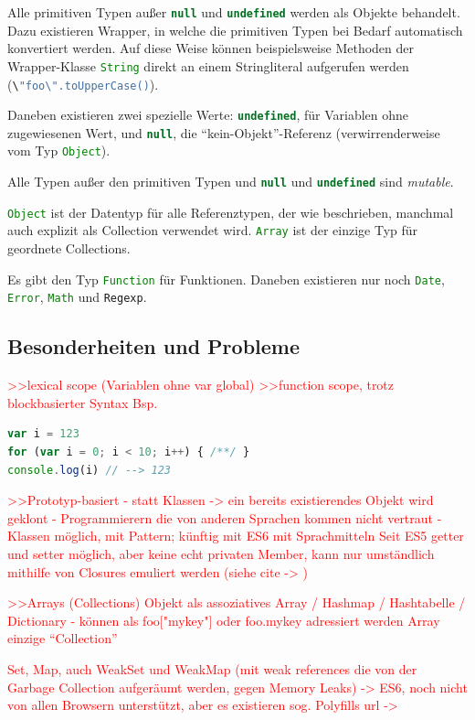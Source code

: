 \documentclass[a4paper, 12pt, hidelinks, listof=totoc, listoftables=totoc, bibliography=totoc]{scrreprt}
\newcommand{\js}[1]{\lstinline[language=JavaScript, style=inline]|#1|}
\newcommand{\TODO}[1]{\textcolor{red}{#1}\newline}
\begin{document}
Alle primitiven Typen außer \js{null} und \js{undefined} werden als Objekte behandelt. Dazu existieren Wrapper, in welche die primitiven Typen bei Bedarf automatisch konvertiert werden. Auf diese Weise können beispielsweise Methoden der Wrapper-Klasse \js{String} direkt an einem Stringliteral aufgerufen werden (\js{\"foo\".toUpperCase()}).

Daneben existieren zwei spezielle Werte: \js{undefined}, für Variablen ohne zugewiesenen Wert, und \js{null}, die "`kein-Objekt"'-Referenz (verwirrenderweise vom Typ \js{Object}).

Alle Typen außer den primitiven Typen und \js{null} und \js{undefined} sind \textit{mutable}.

\js{Object} ist der Datentyp für alle Referenztypen, der wie beschrieben, manchmal auch explizit als Collection verwendet wird. \js{Array} ist der einzige Typ für geordnete Collections.

Es gibt den Typ \js{Function} für Funktionen. Daneben existieren nur noch \js{Date}, \js{Error}, \js{Math} und \js{Regexp}.
\cite[S. 29 ff.]{flanagan2011.JDG}


\subsection{Besonderheiten und Probleme}

\TODO{>>lexical scope (Variablen ohne var global)}
\TODO{>>function scope, trotz blockbasierter Syntax}
\TODO{Bsp.}
\begin{lstlisting}[language=JavaScript, style=snippet]
var i = 123
for (var i = 0; i < 10; i++) { /**/ }
console.log(i) // --> 123
\end{lstlisting}


\TODO{>>Prototyp-basiert}
\TODO{- statt Klassen}
\TODO{-> ein bereits existierendes Objekt wird geklont}
\TODO{- Programmierern die von anderen Sprachen kommen nicht vertraut}
\TODO{- Klassen möglich, mit Pattern; künftig mit ES6 mit Sprachmitteln}
\TODO{Seit ES5 getter und setter möglich, aber keine echt privaten Member, kann nur umständlich mithilfe von Closures emuliert werden}
\TODO{(siehe cite -> %
)}


\TODO{>>Arrays (Collections)}
\TODO{Objekt als assoziatives Array / Hashmap / Hashtabelle / Dictionary}
\TODO{- können als foo["mykey"] oder foo.mykey adressiert werden}
\TODO{Array einzige "`Collection"'}

\TODO{Set, Map, auch WeakSet und WeakMap (mit weak references die von der Garbage Collection aufgeräumt werden, gegen Memory Leaks) -> ES6, noch nicht von allen Browsern unterstützt, aber es existieren sog. Polyfills }
\TODO{url -> %
}
\end{document}
